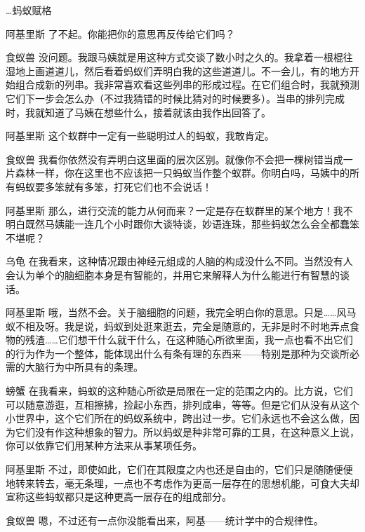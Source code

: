 \begin{dialog}{…蚂蚁赋格}
\begin{dialogue}
\item[阿基里斯]了不起。你能把你的意思再反传给它们吗？

\item[食蚁兽]没问题。我跟马姨就是用这种方式交谈了数小时之久的。我拿着一根棍往湿地上画道道儿，然后看着蚂蚁们弄明白我的这些道道儿。不一会儿，有的地方开始组合成新的列串。我非常喜欢看这些列串的形成过程。在它们组合时，我就预测它们下一步会怎么办（不过我猜错的时候比猜对的时候要多）。当串的排列完成时，我就知道了马姨在想些什么，接着就该由我作出回答了。

\item[阿基里斯]这个蚁群中一定有一些聪明过人的蚂蚁，我敢肯定。

\item[食蚁兽]我看你依然没有弄明白这里面的层次区别。就像你不会把一棵树错当成一片森林一样，你在这里也不应该把一只蚂蚁当作整个蚁群。你明白吗，马姨中的所有蚂蚁要多笨就有多笨，打死它们也不会说话！

\item[阿基里斯]那么，进行交流的能力从何而来？一定是存在蚁群里的某个地方！我不明白既然马姨能一连几个小时跟你大谈特谈，妙语连珠，那些蚂蚁怎么会全都蠢笨不堪呢？

\item[乌龟]在我看来，这种情况跟由神经元组成的人脑的构成没什么不同。当然没有人会认为单个的脑细胞本身是有智能的，并用它来解释人为什么能进行有智慧的谈话。

\item[阿基里斯]哦，当然不会。关于脑细胞的问题，我完全明白你的意思。只是……风马蚁不相及呀。我是说，蚂蚁到处逛来逛去，完全是随意的，无非是时不时地弄点食物的残渣……它们想干什么就干什么，在这种随心所欲里面，我一点也看不出它们的行为作为一个整体，能体现出什么有条有理的东西来——特别是那种为交谈所必需的大脑行为中所具有的条理。

\item[螃蟹]在我看来，蚂蚁的这种随心所欲是局限在一定的范围之内的。比方说，它们可以随意游逛，互相擦拂，捡起小东西，排列成串，等等。但是它们从没有从这个小世界中，这个它们所在的蚂蚁系统中，跨出过一步。它们永远也不会这么做，因为它们没有作这种想象的智力。所以蚂蚁是种非常可靠的工具，在这种意义上说，你可以依靠它们用某种方法来从事某项任务。

\item[阿基里斯]不过，即使如此，它们在其限度之内也还是自由的，它们只是随随便便地转来转去，毫无条理，一点也不考虑作为更高一层存在的思想机能，可食大夫却宣称这些蚂蚁都只是这种更高一层存在的组成部分。

\item[食蚁兽]嗯，不过还有一点你没能看出来，阿基——统计学中的合规律性。


\end{dialogue}
\end{dialog}
